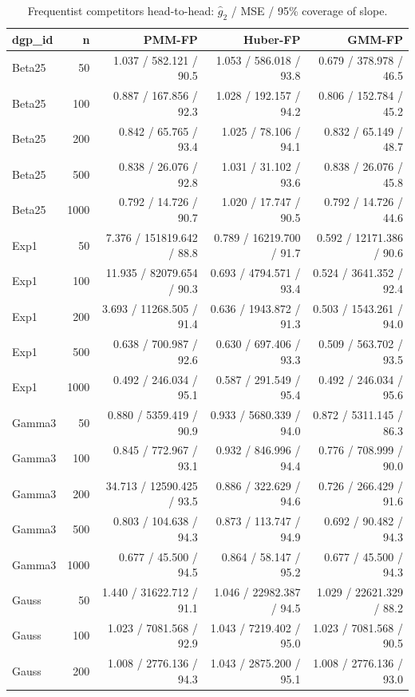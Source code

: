 \begin{table}[t]
\centering
\caption{Frequentist competitors head-to-head: $\hat g_2$ / MSE / 95\% coverage of slope.}
\label{tab:mc-competitors}
\begin{tabular}{lrrrr}
\toprule
dgp_id & n & PMM-FP & Huber-FP & GMM-FP \\
\midrule
Beta25 & 50 & 1.037 / 582.121 / 90.5 & 1.053 / 586.018 / 93.8 & 0.679 / 378.978 / 46.5 \\
Beta25 & 100 & 0.887 / 167.856 / 92.3 & 1.028 / 192.157 / 94.2 & 0.806 / 152.784 / 45.2 \\
Beta25 & 200 & 0.842 / 65.765 / 93.4 & 1.025 / 78.106 / 94.1 & 0.832 / 65.149 / 48.7 \\
Beta25 & 500 & 0.838 / 26.076 / 92.8 & 1.031 / 31.102 / 93.6 & 0.838 / 26.076 / 45.8 \\
Beta25 & 1000 & 0.792 / 14.726 / 90.7 & 1.020 / 17.747 / 90.5 & 0.792 / 14.726 / 44.6 \\
Exp1 & 50 & 7.376 / 151819.642 / 88.8 & 0.789 / 16219.700 / 91.7 & 0.592 / 12171.386 / 90.6 \\
Exp1 & 100 & 11.935 / 82079.654 / 90.3 & 0.693 / 4794.571 / 93.4 & 0.524 / 3641.352 / 92.4 \\
Exp1 & 200 & 3.693 / 11268.505 / 91.4 & 0.636 / 1943.872 / 91.3 & 0.503 / 1543.261 / 94.0 \\
Exp1 & 500 & 0.638 / 700.987 / 92.6 & 0.630 / 697.406 / 93.3 & 0.509 / 563.702 / 93.5 \\
Exp1 & 1000 & 0.492 / 246.034 / 95.1 & 0.587 / 291.549 / 95.4 & 0.492 / 246.034 / 95.6 \\
Gamma3 & 50 & 0.880 / 5359.419 / 90.9 & 0.933 / 5680.339 / 94.0 & 0.872 / 5311.145 / 86.3 \\
Gamma3 & 100 & 0.845 / 772.967 / 93.1 & 0.932 / 846.996 / 94.4 & 0.776 / 708.999 / 90.0 \\
Gamma3 & 200 & 34.713 / 12590.425 / 93.5 & 0.886 / 322.629 / 94.6 & 0.726 / 266.429 / 91.6 \\
Gamma3 & 500 & 0.803 / 104.638 / 94.3 & 0.873 / 113.747 / 94.9 & 0.692 / 90.482 / 94.3 \\
Gamma3 & 1000 & 0.677 / 45.500 / 94.5 & 0.864 / 58.147 / 95.2 & 0.677 / 45.500 / 94.3 \\
Gauss & 50 & 1.440 / 31622.712 / 91.1 & 1.046 / 22982.387 / 94.5 & 1.029 / 22621.329 / 88.2 \\
Gauss & 100 & 1.023 / 7081.568 / 92.9 & 1.043 / 7219.402 / 95.0 & 1.023 / 7081.568 / 90.5 \\
Gauss & 200 & 1.008 / 2776.136 / 94.3 & 1.043 / 2875.200 / 95.1 & 1.008 / 2776.136 / 93.0 \\

\end{tabular}
\end{table}
